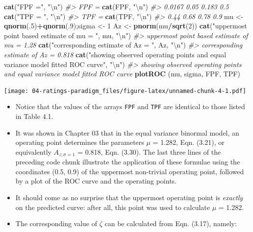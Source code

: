 \documentclass[
]{book}
\newenvironment{Shaded}{\begin{snugshade}}{\end{snugshade}}
\newcommand{\CharTok}[1]{\textcolor[rgb]{0.31,0.60,0.02}{#1}}
\newcommand{\CommentTok}[1]{\textcolor[rgb]{0.56,0.35,0.01}{\textit{#1}}}
\newcommand{\DecValTok}[1]{\textcolor[rgb]{0.00,0.00,0.81}{#1}}
\newcommand{\KeywordTok}[1]{\textcolor[rgb]{0.13,0.29,0.53}{\textbf{#1}}}
\newcommand{\NormalTok}[1]{#1}
\newcommand{\OperatorTok}[1]{\textcolor[rgb]{0.81,0.36,0.00}{\textbf{#1}}}
\newcommand{\StringTok}[1]{\textcolor[rgb]{0.31,0.60,0.02}{#1}}
\begin{document}
\begin{Shaded}
\begin{Highlighting}[]
\KeywordTok{cat}\NormalTok{(}\StringTok{"FPF ="}\NormalTok{, }\StringTok{"}\CharTok{\textbackslash{}n}\StringTok{"}\NormalTok{)}
\CommentTok{\#\textgreater{} FPF =}
\KeywordTok{cat}\NormalTok{(FPF, }\StringTok{"}\CharTok{\textbackslash{}n}\StringTok{"}\NormalTok{)}
\CommentTok{\#\textgreater{} 0.0167 0.05 0.183 0.5}
\KeywordTok{cat}\NormalTok{(}\StringTok{"TPF = "}\NormalTok{, }\StringTok{"}\CharTok{\textbackslash{}n}\StringTok{"}\NormalTok{)}
\CommentTok{\#\textgreater{} TPF =}
\KeywordTok{cat}\NormalTok{(TPF, }\StringTok{"}\CharTok{\textbackslash{}n}\StringTok{"}\NormalTok{)}
\CommentTok{\#\textgreater{} 0.44 0.68 0.78 0.9}
\NormalTok{mu \textless{}{-}}\StringTok{ }\KeywordTok{qnorm}\NormalTok{(.}\DecValTok{5}\NormalTok{)}\OperatorTok{+}\KeywordTok{qnorm}\NormalTok{(.}\DecValTok{9}\NormalTok{);sigma \textless{}{-}}\StringTok{ }\DecValTok{1}
\NormalTok{Az \textless{}{-}}\StringTok{ }\KeywordTok{pnorm}\NormalTok{(mu}\OperatorTok{/}\KeywordTok{sqrt}\NormalTok{(}\DecValTok{2}\NormalTok{))}
\KeywordTok{cat}\NormalTok{(}\StringTok{"uppermost point based estimate of mu = "}\NormalTok{, mu, }\StringTok{"}\CharTok{\textbackslash{}n}\StringTok{"}\NormalTok{)}
\CommentTok{\#\textgreater{} uppermost point based estimate of mu =  1.28}
\KeywordTok{cat}\NormalTok{(}\StringTok{"corresponding estimate of Az = "}\NormalTok{, Az, }\StringTok{"}\CharTok{\textbackslash{}n}\StringTok{"}\NormalTok{)}
\CommentTok{\#\textgreater{} corresponding estimate of Az =  0.818}
\KeywordTok{cat}\NormalTok{(}\StringTok{"showing observed operating points and equal variance model fitted ROC curve"}\NormalTok{, }\StringTok{"}\CharTok{\textbackslash{}n}\StringTok{"}\NormalTok{)}
\CommentTok{\#\textgreater{} showing observed operating points and equal variance model fitted ROC curve}
\KeywordTok{plotROC}\NormalTok{ (mu, sigma, FPF, TPF)}
\end{Highlighting}
\end{Shaded}

\texttt{[image: 04-ratings-paradigm\_files/figure-latex/unnamed-chunk-4-1.pdf]}

\begin{itemize}
\item
  Notice that the values of the arrays \texttt{FPF} and \texttt{TPF} are identical to those listed in Table 4.1.
\item
  It was shown in Chapter 03 that in the equal variance binormal model, an operating point determines the parameters \(\mu\) = 1.282, Eqn. (3.21), or equivalently \(A_{z;\sigma = 1}\) = 0.818, Eqn. (3.30). The last three lines of the preceding code chunk illustrate the application of these formulae using the coordinates (0.5, 0.9) of the uppermost non-trivial operating point, followed by a plot of the ROC curve and the operating points.
\item
  It should come as no surprise that the uppermost operating point is \emph{exactly} on the predicted curve: after all, this point was used to calculate \(\mu\) = 1.282.
\item
  The corresponding value of \(\zeta\) can be calculated from Eqn. (3.17), namely:
\end{itemize}
\end{document}
